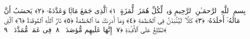 
  
    
  
    
    

\nopagebreak
  بِسمِ ٱللَّهِ ٱلرَّحمَـٰنِ ٱلرَّحِيمِ
  وَيلٌۭ لِّكُلِّ هُمَزَةٍۢ لُّمَزَةٍ ﴿١﴾
 ٱلَّذِى جَمَعَ مَالًۭا وَعَدَّدَهُۥ ﴿٢﴾
 يَحسَبُ أَنَّ مَالَهُۥٓ أَخلَدَهُۥ ﴿٣﴾
 كَلَّا ۖ لَيُنۢبَذَنَّ فِى ٱلحُطَمَةِ ﴿٤﴾
 وَمَآ أَدرَىٰكَ مَا ٱلحُطَمَةُ ﴿٥﴾
 نَارُ ٱللَّهِ ٱلمُوقَدَةُ ﴿٦﴾
 ٱلَّتِى تَطَّلِعُ عَلَى ٱلأَفـِٔدَةِ ﴿٧﴾
 إِنَّهَا عَلَيهِم مُّؤصَدَةٌۭ ﴿٨﴾
 فِى عَمَدٍۢ مُّمَدَّدَةٍۭ ﴿٩﴾
 
